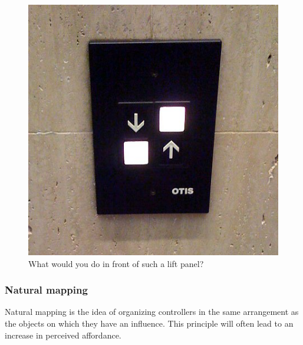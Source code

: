\documentclass[a4paper,11pt] {article}
\theoremstyle{definition}
\begin{document}
\begin{figure}[h]
\centering
\includegraphics[scale=0.20]{fig-report/bad-switches.jpg}
\caption{What would you do in front of such a lift panel?}
\label{fig:lift-bad-design}
\end{figure}

    \subsubsection{Natural mapping}
Natural mapping is the idea of organizing controllers in the same arrangement as the objects on which they have an influence. This principle will often lead to an increase in perceived affordance.\\
\end{document}
